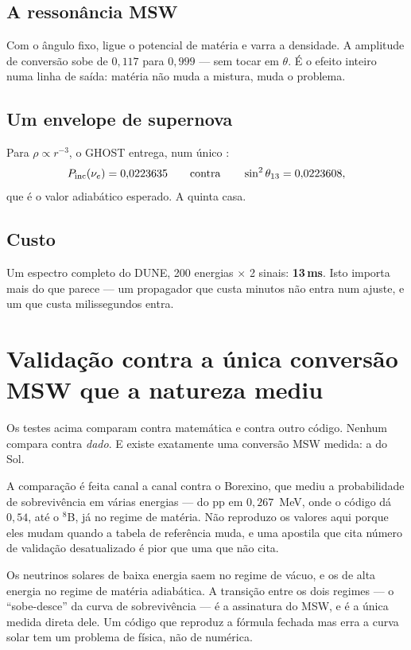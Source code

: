 \subsection{A ressonância MSW}

Com o ângulo fixo, ligue o potencial de matéria e varra a densidade. A
amplitude de conversão sobe de $0{,}117$ para $0{,}999$ --- sem tocar em
$\theta$. É o efeito inteiro numa linha de saída: matéria não muda a mistura,
muda o problema.

\subsection{Um envelope de supernova}

Para $\rho \propto r^{-3}$, o GHOST entrega, num único :
\[
  P_{\rm inc}(\nu_e) = 0{,}0223635
  \qquad\text{contra}\qquad
  \sin^2\theta_{13} = 0{,}0223608,
\]
que é o valor adiabático esperado. A quinta casa.

\subsection{Custo}

Um espectro completo do DUNE, 200 energias $\times$ 2 sinais: \textbf{13\,ms}.
Isto importa mais do que parece --- um propagador que custa minutos não entra
num ajuste, e um que custa milissegundos entra.

\section{Validação contra a única conversão MSW que a natureza mediu}

Os testes acima comparam contra matemática e contra outro código. Nenhum
compara contra \emph{dado}. E existe exatamente uma conversão MSW medida: a do
Sol.

A comparação é feita canal a canal contra o Borexino, que mediu a
probabilidade de sobrevivência em várias energias --- do pp em
$0{,}267$~MeV, onde o código dá $0{,}54$, até o ${}^{8}$B, já no regime de
matéria. Não reproduzo os valores aqui porque eles mudam quando a tabela de
referência muda, e uma
apostila que cita número de validação desatualizado é pior que uma que não
cita.

\begin{nota}
Os neutrinos solares de baixa energia saem no regime de vácuo, e os de alta
energia no regime de matéria adiabática. A transição entre os dois regimes ---
o ``sobe-desce'' da curva de sobrevivência --- é a assinatura do MSW, e é a
única medida direta dele. Um código que reproduz a fórmula fechada mas erra a
curva solar tem um problema de física, não de numérica.
\end{nota}

